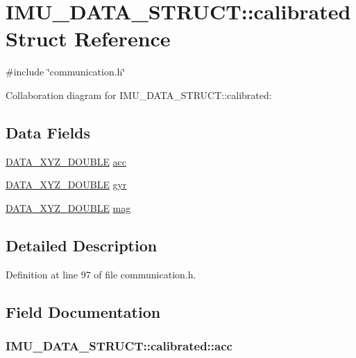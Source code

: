 \hypertarget{structIMU__DATA__STRUCT_1_1calibrated}{
\section{IMU\_\-DATA\_\-STRUCT::calibrated Struct Reference}
\label{structIMU__DATA__STRUCT_1_1calibrated}
}


{\ttfamily \#include \char`\"{}communication.h\char`\"{}}



Collaboration diagram for IMU\_\-DATA\_\-STRUCT::calibrated:\subsection*{Data Fields}
\begin{DoxyCompactItemize}
\item 
\hyperlink{structDATA__XYZ__DOUBLE}{DATA\_\-XYZ\_\-DOUBLE} \hyperlink{structIMU__DATA__STRUCT_1_1calibrated_a281a7fdb40a05ed97388f18b9bb90c81}{acc}
\item 
\hyperlink{structDATA__XYZ__DOUBLE}{DATA\_\-XYZ\_\-DOUBLE} \hyperlink{structIMU__DATA__STRUCT_1_1calibrated_a8a54aded6ce608f1b7d2b4a0c52c248b}{gyr}
\item 
\hyperlink{structDATA__XYZ__DOUBLE}{DATA\_\-XYZ\_\-DOUBLE} \hyperlink{structIMU__DATA__STRUCT_1_1calibrated_a2fde6c6759e0fda17e272c32096cb9ec}{mag}
\end{DoxyCompactItemize}


\subsection{Detailed Description}


Definition at line 97 of file communication.h.



\subsection{Field Documentation}
\hypertarget{structIMU__DATA__STRUCT_1_1calibrated_a281a7fdb40a05ed97388f18b9bb90c81}{
\subsubsection[{acc}]{ {\bf IMU\_\-DATA\_\-STRUCT::calibrated::acc}}}
\label{structIMU__DATA__STRUCT_1_1calibrated_a281a7fdb40a05ed97388f18b9bb90c81}


